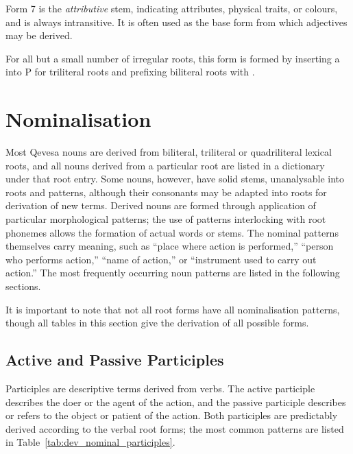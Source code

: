 \documentclass[grammar]{subfiles}
\begin{document}
  Form 7 is the \emph{attributive} stem, indicating attributes, physical traits, or colours, and is always intransitive. 
  It is often used as the base form from which adjectives may be derived.

  For all but a small number of irregular roots, this form is formed by inserting a  into P for triliteral roots and prefixing biliteral roots with .

%

  \section{Nominalisation}
  \label{sec:dev_nominalisation}

  Most Qevesa nouns are derived from biliteral, triliteral or quadriliteral lexical roots, and all nouns derived from a particular root are listed in a dictionary under that root entry. 
  Some nouns, however, have solid stems, unanalysable into roots and patterns, although their consonants may be adapted into roots for derivation of new terms. 
  Derived nouns are formed through application of particular morphological patterns; the use of patterns interlocking with root phonemes allows the formation of actual words or stems. 
  The nominal patterns themselves carry meaning, such as “place where action is performed,” “person who performs action,” “name of action,” or “instrument used to carry out action.” 
  The most frequently occurring noun patterns are listed in the following sections.

  It is important to note that not all root forms have all nominalisation patterns, though all tables in this section give the derivation of all possible forms. 

  \subsection{Active and Passive Participles}
  \label{ssec:dev_active_passive_participles}

  Participles are descriptive terms derived from verbs. 
  The active participle describes the doer or the agent of the action, and the passive participle describes or refers to the object or patient of the action. 
  Both participles are predictably derived according to the verbal root forms; the most common patterns are listed in Table~\ref{tab:dev_nominal_participles}.
\end{document}
